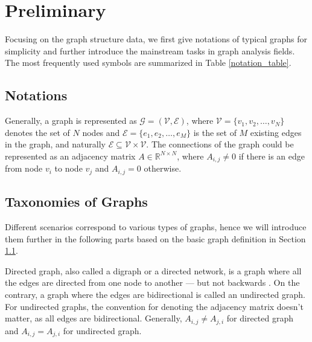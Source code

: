 \section{Preliminary}
\label{preliminary}

Focusing on the graph structure data, we first give notations of typical graphs for simplicity and further introduce the mainstream tasks in graph analysis fields. The most frequently used symbols are summarized in Table \ref{notation_table}.
\subsection{Notations}
\label{notation}
Generally, a graph is represented as $\mathcal{G}=(\mathcal{V},\mathcal{E})$, where $\mathcal{V}=\{v_1, v_2, \dots, v_N \}$ denotes the set of $N$ nodes and $\mathcal{E}=\{e_1, e_2, \dots, e_M \}$ is the set of $M$ existing edges in the graph, and naturally $\mathcal{E} \subseteq \mathcal{V} \times \mathcal{V}$. The connections of the graph could be represented as an adjacency matrix $A \in \mathbb{R}^{N\times N}$, where $A_{i,j}\neq 0$ if there is an edge from node $v_i$ to node $v_j$ and $A_{i,j}=0$ otherwise.


\subsection{Taxonomies of Graphs}
Different scenarios correspond to various types of graphs, hence we will introduce them further in the following parts based on the basic graph definition in Section \ref{notation}.

 Directed graph, also called a digraph or a directed network, is a graph where all the edges are directed from one node to another  — but not backwards \cite{chartrand1977introductory}. On the contrary, a graph where the edges are bidirectional is called an undirected graph. For undirected graphs, the convention for denoting the adjacency matrix doesn't matter, as all edges are bidirectional. Generally, $A_{i,j}\neq A_{j,i}$ for directed graph and $A_{i,j}=A_{j,i}$ for undirected graph.

